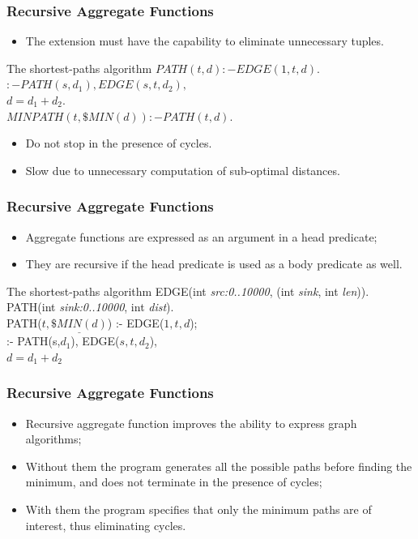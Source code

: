 \documentclass{beamer}
\begin{document}
\frame
{
	\frametitle{Recursive Aggregate Functions}
	
	\begin{itemize}
		\item The extension must have the capability to eliminate unnecessary tuples.
	\end{itemize}

	\begin{block}{The shortest-paths algorithm}
		$PATH(t,d) :- EDGE(1,t,d).$ \\
		\hspace{1.8cm} $:- PATH(s,d_{1}), EDGE(s,t,d_{2}),$ \\
		\hspace{2.4cm} $d = d_{1}+d_{2}.$ \\
		$ MINPATH(t,\$ MIN(d)) :- PATH(t,d). $
	\end{block}
	
	\begin{itemize}
		\item Do not stop in the presence of cycles.
		\item Slow due to unnecessary computation of sub-optimal distances.
	\end{itemize}
}

\frame
{
	\frametitle{Recursive Aggregate Functions}
	
	\begin{itemize}
		\item Aggregate functions are expressed as an argument in a head predicate;
		\item They are recursive if the head predicate is used as a body predicate as well.
	\end{itemize}

	\begin{block}{The shortest-paths algorithm}
		EDGE(int \textit{src:0..10000}, (int \textit{sink}, int \textit{len})). \\
		PATH(int \textit{sink:0..10000}, int \textit{dist}). \\
		PATH($t,\underline{\$MIN(d)}$) :- EDGE($1,t,d$); \\
		\hspace{3cm} :- PATH(s,$d_{1}$), EDGE($s,t,d_{2}$), \\
		\hspace{3.5cm} $d = d_{1}+d_{2}$
	\end{block}
}

\frame
{
	\frametitle{Recursive Aggregate Functions}

	\begin{itemize}
		\item Recursive aggregate function improves the ability to express graph algorithms;
		\item Without them the program generates all the possible paths before finding the minimum, and does not terminate in the presence of cycles;
		\item With them the program specifies that only the minimum paths are of interest, thus eliminating cycles.
	\end{itemize}
}
\end{document}
